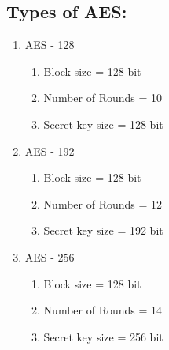 \documentclass[11pt]{article}
\begin{document}
\subsection{Types of AES:}
\begin{enumerate}
    \item AES - 128
    \begin{enumerate}
        \item Block size = 128 bit
        \item Number of Rounds = 10
        \item Secret key size = 128 bit
    \end{enumerate}
    \item AES - 192
    \begin{enumerate}
        \item Block size = 128 bit
        \item Number of Rounds = 12
        \item Secret key size = 192 bit
    \end{enumerate}
    \item AES - 256
    \begin{enumerate}
        \item Block size = 128 bit
        \item Number of Rounds = 14
        \item Secret key size = 256 bit
    \end{enumerate}
\end{enumerate}
\end{document}
